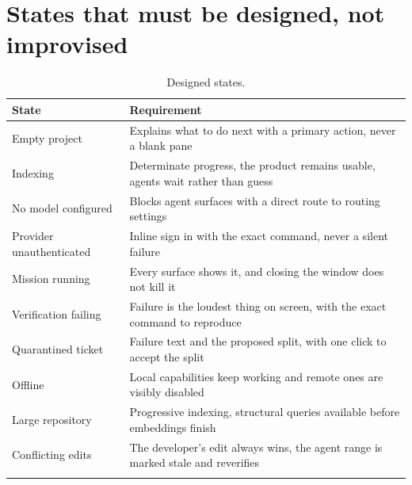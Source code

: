 \section{States that must be designed, not improvised}

\begin{longtable}{@{}p{} p{}@{}}
\toprule
\textbf{State} & \textbf{Requirement} \\
\midrule
\endhead
Empty project & Explains what to do next with a primary action, never a blank pane \\
Indexing & Determinate progress, the product remains usable, agents wait rather than guess \\
No model configured & Blocks agent surfaces with a direct route to routing settings \\
Provider unauthenticated & Inline sign in with the exact command, never a silent failure \\
Mission running & Every surface shows it, and closing the window does not kill it \\
Verification failing & Failure is the loudest thing on screen, with the exact command to reproduce \\
Quarantined ticket & Failure text and the proposed split, with one click to accept the split \\
Offline & Local capabilities keep working and remote ones are visibly disabled \\
Large repository & Progressive indexing, structural queries available before embeddings finish \\
Conflicting edits & The developer's edit always wins, the agent range is marked stale and reverifies \\
\bottomrule
\caption{Designed states.}
\end{longtable}

